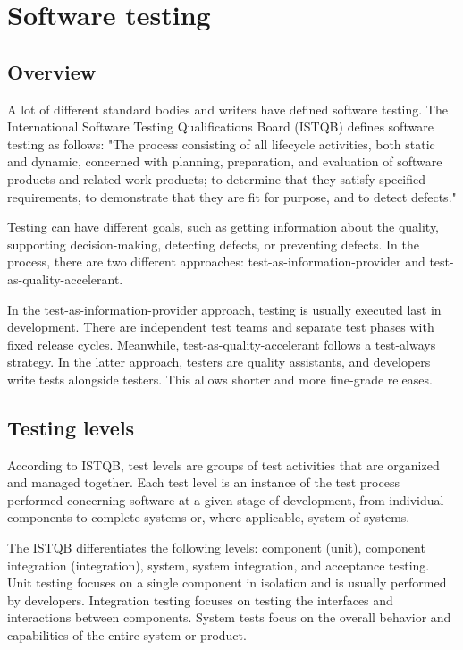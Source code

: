 \section{Software testing}
\label{chap:testing}
\subsection{Overview}
A lot of different standard bodies and writers have defined software testing.
The International Software Testing Qualifications Board (ISTQB) defines software testing
as follows: "The process consisting of all lifecycle activities, both static and
dynamic, concerned with planning, preparation, and evaluation of software products and
related work products; to determine that they satisfy specified requirements,
to demonstrate that they are fit for purpose, and to detect defects." \cite{ctfl_syllabus:2023}

Testing can have different goals, such as getting information about the quality,
supporting decision-making, detecting defects, or preventing defects.
In the process, there are two different approaches: test-as-information-provider
and test-as-quality-accelerant.

In the test-as-information-provider approach, testing is usually executed last in development.
There are independent test teams and separate test phases with fixed release cycles.
Meanwhile, test-as-quality-accelerant follows a test-always strategy.
In the latter approach, testers are quality assistants, and developers
write tests alongside testers.
This allows shorter and more fine-grade releases.
\subsection{Testing levels}

According to ISTQB, test levels are groups of test activities that are organized
and managed together.
Each test level is an instance of the test process performed concerning
software at a given stage of development, from individual components to complete
systems or, where applicable, system of systems. \cite{ctfl_syllabus:2023}

The ISTQB differentiates the following levels: component (unit), component integration (integration), system, system integration, and acceptance testing. Unit testing focuses on a single component in isolation and is usually performed by developers. Integration testing focuses on testing the interfaces and interactions between components. System tests focus on the overall behavior and capabilities of the entire system or product.

